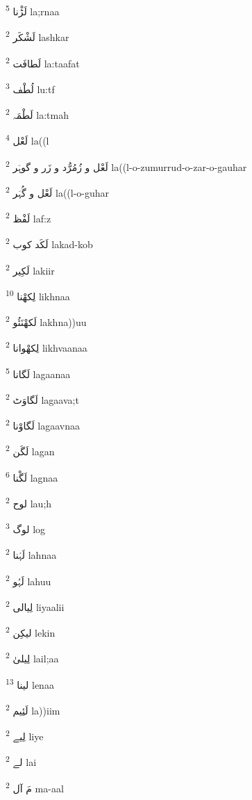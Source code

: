 \documentclass[12pt]{article}
\begin{document}
\begin{multicols}{5}
{\ur لَڑْنا}   \textsuperscript{5} la;rnaa

{\ur لَشْکَر}   \textsuperscript{2} lashkar

{\ur لَطافَت}   \textsuperscript{2} la:taafat

{\ur لُطْف}   \textsuperscript{3} lu:tf

{\ur لَطْمَہ}   \textsuperscript{2} la:tmah

{\ur لَعْل}   \textsuperscript{4} la((l

{\ur لَعْل و زُمُرُّد و زَر و گوہَر}   \textsuperscript{2} la((l-o-zumurrud-o-zar-o-gauhar

{\ur لَعْل و گُہَر}   \textsuperscript{2} la((l-o-guhar

{\ur لَفْظ}   \textsuperscript{2} laf:z

{\ur لَکَد کوب}   \textsuperscript{2} lakad-kob

{\ur لَکِیر}   \textsuperscript{2} lakiir

{\ur لِکھْنا}   \textsuperscript{10} likhnaa

{\ur لَکھْنَئُو}   \textsuperscript{2} lakhna))uu

{\ur لِکھْوانا}   \textsuperscript{2} likhvaanaa

{\ur لَگانا}   \textsuperscript{5} lagaanaa

{\ur لَگاوَٹ}   \textsuperscript{2} lagaava;t

{\ur لَگاوْنا}   \textsuperscript{2} lagaavnaa

{\ur لَگَن}   \textsuperscript{2} lagan

{\ur لَگْنا}   \textsuperscript{6} lagnaa

{\ur لوح}   \textsuperscript{2} lau;h

{\ur لوگ}   \textsuperscript{3} log

{\ur لَہْنا}   \textsuperscript{2} lahnaa

{\ur لَہُو}   \textsuperscript{2} lahuu

{\ur لِیالی}   \textsuperscript{2} liyaalii

{\ur لیکِن}   \textsuperscript{2} lekin

{\ur لِیلیٰ}   \textsuperscript{2} lail;aa

{\ur لینا}   \textsuperscript{13} lenaa

{\ur لَئِیم}   \textsuperscript{2} la))iim

{\ur لِیے}   \textsuperscript{2} liye

{\ur لے}   \textsuperscript{2} lai

{\ur مَ آل}   \textsuperscript{2} ma-aal


\end{multicols}
\end{document}
